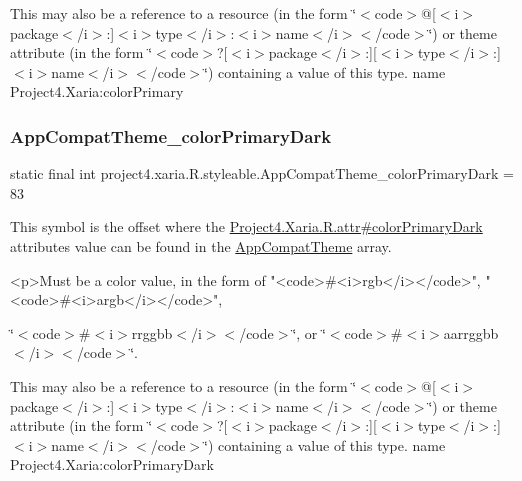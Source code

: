 This may also be a reference to a resource (in the form \char`\"{}$<$code$>$@\mbox{[}$<$i$>$package$<$/i$>$\+:\mbox{]}$<$i$>$type$<$/i$>$\+:$<$i$>$name$<$/i$>$$<$/code$>$\char`\"{}) or theme attribute (in the form \char`\"{}$<$code$>$?\mbox{[}$<$i$>$package$<$/i$>$\+:\mbox{]}\mbox{[}$<$i$>$type$<$/i$>$\+:\mbox{]}$<$i$>$name$<$/i$>$$<$/code$>$\char`\"{}) containing a value of this type.  name Project4.\+Xaria\+:color\+Primary \mbox{\label{classproject4_1_1xaria_1_1R_1_1styleable_ae0e5b2077cb1158569a4fbda2aa8dd71}} 
\subsubsection{\texorpdfstring{App\+Compat\+Theme\+\_\+color\+Primary\+Dark}{AppCompatTheme\_colorPrimaryDark}}
{\footnotesize\ttfamily static final int project4.\+xaria.\+R.\+styleable.\+App\+Compat\+Theme\+\_\+color\+Primary\+Dark = 83\hspace{0.3cm}{\ttfamily [static]}}

This symbol is the offset where the \hyperlink{}{Project4.\+Xaria.\+R.\+attr\#color\+Primary\+Dark} attribute\textquotesingle{}s value can be found in the \hyperlink{classproject4_1_1xaria_1_1R_1_1styleable_aad8bec413e2350f9404e6ff0e831a85d}{App\+Compat\+Theme} array.

\begin{DoxyVerb}      <p>Must be a color value, in the form of "<code>#<i>rgb</i></code>", "<code>#<i>argb</i></code>",
\end{DoxyVerb}
 \char`\"{}$<$code$>$\#$<$i$>$rrggbb$<$/i$>$$<$/code$>$\char`\"{}, or \char`\"{}$<$code$>$\#$<$i$>$aarrggbb$<$/i$>$$<$/code$>$\char`\"{}. 

This may also be a reference to a resource (in the form \char`\"{}$<$code$>$@\mbox{[}$<$i$>$package$<$/i$>$\+:\mbox{]}$<$i$>$type$<$/i$>$\+:$<$i$>$name$<$/i$>$$<$/code$>$\char`\"{}) or theme attribute (in the form \char`\"{}$<$code$>$?\mbox{[}$<$i$>$package$<$/i$>$\+:\mbox{]}\mbox{[}$<$i$>$type$<$/i$>$\+:\mbox{]}$<$i$>$name$<$/i$>$$<$/code$>$\char`\"{}) containing a value of this type.  name Project4.\+Xaria\+:color\+Primary\+Dark \mbox{\label{classproject4_1_1xaria_1_1R_1_1styleable_acfe6607b27354b339604b23a504dfad6}} 
